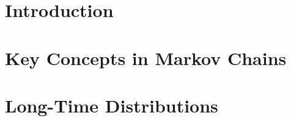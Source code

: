 \documentclass[british,11pt,a4paper]{report}
\begin{document}
\maketitle
\tableofcontents

\chapter{Introduction}

\chapter{Key Concepts in Markov Chains}

\chapter{Long-Time Distributions}

\end{document}
